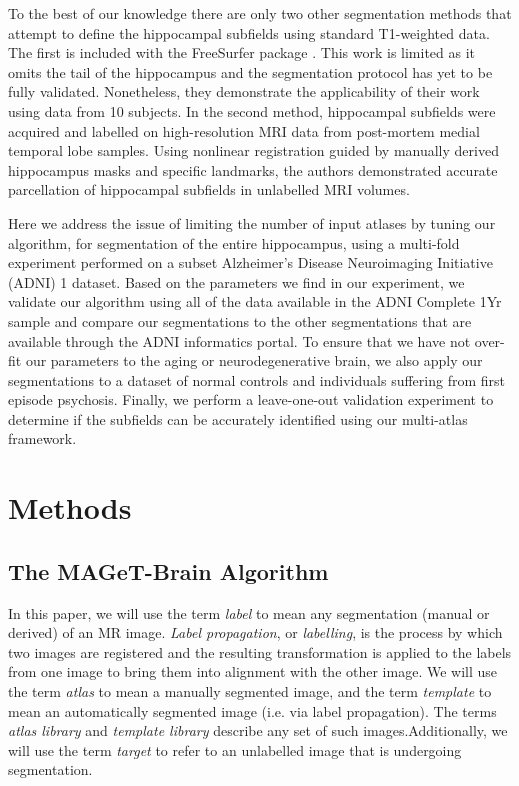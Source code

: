 \documentclass{article}\usepackage{graphicx, color}
\newcommand{\mb}{MAGeT-Brain }
\begin{document}
To the best of our knowledge there are only two other segmentation methods that
attempt to define the hippocampal subfields using standard T1-weighted data.
The first is included with the FreeSurfer package \citep{VanLeemput2009}.  This
work is limited as it omits the tail of the hippocampus and the segmentation
protocol has yet to be fully validated.  Nonetheless, they demonstrate the
applicability of their work using data from 10 subjects.  In the second method,
\citet{Yushkevich2009} hippocampal subfields were acquired and labelled on
high-resolution MRI data from post-mortem medial temporal lobe samples. Using
nonlinear registration guided by manually derived hippocampus masks and specific
landmarks, the authors demonstrated accurate parcellation of hippocampal subfields in
unlabelled MRI volumes. 

Here we address the issue of limiting the number of input atlases by tuning our
algorithm, for segmentation of the entire hippocampus, using a multi-fold
experiment performed on a subset Alzheimer's Disease Neuroimaging Initiative
(ADNI) 1 dataset. Based on the parameters we find in our experiment, we validate
our algorithm using all of the data available in the ADNI Complete 1Yr sample
and compare our segmentations to the other segmentations that are available
through the ADNI informatics portal.  To ensure that we have not over-fit our
parameters to the aging or neurodegenerative brain, we also apply our
segmentations to a dataset of normal controls and individuals suffering from
first episode psychosis. Finally, we perform a leave-one-out validation
experiment to determine if the subfields can be accurately identified using our
multi-atlas framework. 


\section{Methods}


\subsection{The \mb Algorithm}
In this paper, we will use the term {\em label} to mean any segmentation (manual or 
derived) of an MR image.  {\em Label propagation}, or {\em labelling}, is the 
process by which two images are registered and the resulting transformation 
is applied to the labels from one image to bring them into alignment with the 
other image. We will use the term {\em atlas} to mean a manually segmented image,
and the term {\em template} to mean an automatically segmented image (i.e. 
via label propagation). The terms {\em atlas library} and {\em template library} 
describe any set of such images.Additionally, we will use the term {\em target} 
to refer to an unlabelled image that is undergoing segmentation.
\end{document}
